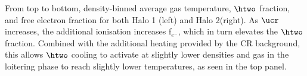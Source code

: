\label{fig:efrac}
From top to bottom, density-binned average gas temperature, $\htwo$ fraction, and free electron fraction for both Halo 1 (left) and Halo 2(right). As $\ucr$ increases, the additional ionisation increases f$_{e^-}$, which in turn elevates the $\htwo$ fraction. Combined with the additional heating provided by the CR background, this allows $\htwo$ cooling to activate at slightly lower densities and gas in the loitering phase to reach slightly lower temperatures, as seen in the top panel.